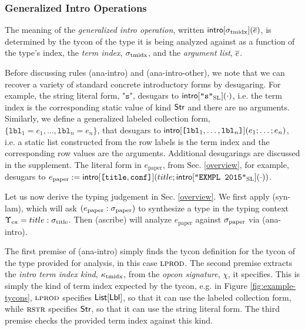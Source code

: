 \subsubsection{Generalized Intro Operations}\label{sec:introop}
\noindent The meaning of the \emph{generalized intro operation}, written $\small{\sf intro}[\sigma_\text{tmidx}](\overline{e})$, is determined by the tycon of the type it is being analyzed against as a function of the type's index, the \emph{term index}, $\sigma_\text{tmidx}$, and the \emph{argument list}, $\overline{e}$.

Before discussing rules (ana-intro) and (ana-intro-other), we note that we can recover a variety of standard concrete introductory forms by desugaring. For example, the string literal form, $\texttt{"s"}$, desugars to ${\sf intro}[\texttt{"s"}_\text{SL}](\cdot)$, i.e. the term index is the corresponding static value of kind ${\sf Str}$ and there are no arguments. Similarly, we define a generalized labeled collection form, $\{\mathtt{lbl}_1=e_1, \ldots, \mathtt{lbl}_n=e_n\}$, that desugars to ${\sf intro}[\texttt{[}\mathtt{lbl}_1, \ldots, \mathtt{lbl}_n\texttt{]}](e_1; \ldots; e_n)$, i.e. a static list constructed from the row labels is the term index and the corresponding row values are the arguments. Additional desugarings are discussed in the supplement. The literal form in $e_\text{paper}$, from Sec. \ref{overview}, for example, desugars to $e_\text{paper}:={\sf intro}[\texttt{[}\texttt{title}, \texttt{conf}\texttt{]}](title; {\sf intro}[\texttt{"EXMPL 2015"}_\text{SL}](\cdot))$. %

Let us now derive the typing judgement in Sec. \ref{overview}. We first apply (syn-lam), which will ask $(e_\text{paper} : \sigma_\text{paper})$ to synthesize a type in the typing context $\Upsilon_\text{ex}=title : \sigma_\text{title}$. Then (ascribe) will analyze $e_\text{paper}$ against $\sigma_\text{paper}$ via (ana-intro). 

The first premise of (ana-intro) simply finds the tycon definition for the tycon of the type provided for analysis, in this case $\textsc{lprod}$. %
The second premise extracts the \emph{intro term index kind}, $\kappa_\text{tmidx}$, from the \emph{opcon signature}, $\chi$, it specifies. This is simply the kind of term index expected by the tycon, e.g. in Figure \ref{fig:example-tycons}, $\textsc{lprod}$ specifies ${\sf List}[{\sf Lbl}]$, so that it can use the labeled collection form, while $\textsc{rstr}$ specifies  ${\sf Str}$, so that it can use the string literal form. The third premise checks the provided term index against this kind.  %



